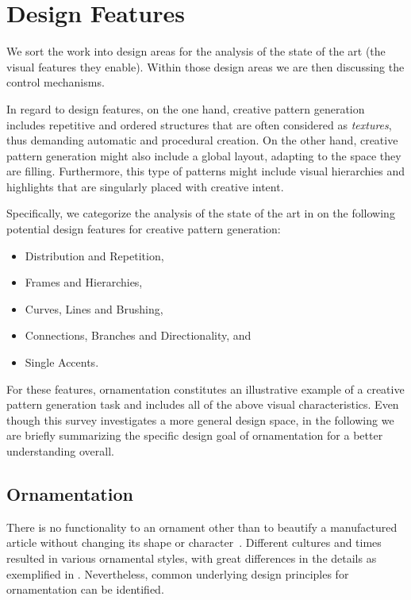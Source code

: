 
\section{Design Features}\label{sec:design}
We sort the work into design areas for the analysis of the state of the art (the visual features they enable). Within those design areas we are then discussing the control mechanisms.

In regard to design features, on the one hand, creative pattern generation includes repetitive and ordered structures that are often considered as \textit{textures}, thus demanding automatic and procedural creation. On the other hand, creative pattern generation might also include a global layout, adapting to the space they are filling. Furthermore, this type of patterns might include visual hierarchies and highlights that are singularly placed with creative intent. 


Specifically, we categorize the analysis of the state of the art in  on the following potential design features for creative pattern generation:
\begin{itemize}
    \item Distribution and Repetition,
    \item Frames and Hierarchies,
    \item Curves, Lines and Brushing,
    \item Connections, Branches and Directionality, and
    \item Single Accents.
\end{itemize}

For these features, ornamentation constitutes an illustrative example of a creative pattern generation task and includes all of the above visual characteristics. Even though this survey investigates a more general design space, in the following we are briefly summarizing the specific design goal of ornamentation for a better understanding overall. 

\subsection{Ornamentation}
\label{subsubsec:ornamentation}

There is no functionality to an ornament other than to beautify a manufactured article without changing its shape or character~\cite{ward_1896_tpo}.
Different cultures and times resulted in various ornamental styles, with great differences in the details as exemplified in . Nevertheless, common underlying design principles for ornamentation can be identified.

